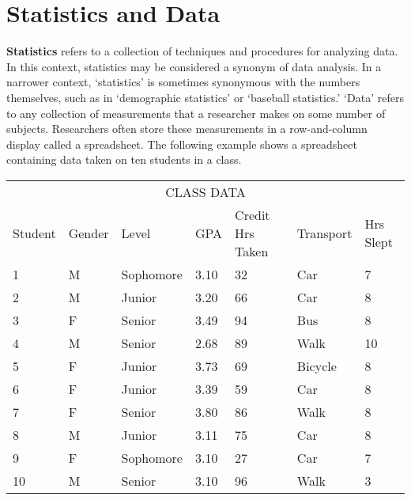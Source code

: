 \documentclass[11pt]{book}\usepackage[]{graphicx}\usepackage[]{color}
\begin{document}

\section{Statistics and Data}

\textbf{Statistics} refers to a collection of techniques and procedures for analyzing data.  In this context, statistics may be considered a synonym of data analysis.  In a narrower context, `statistics' is sometimes synonymous with the numbers themselves, such as in `demographic statistics' or `baseball statistics.'  `Data' refers to any collection of measurements that a researcher makes on some number of subjects.  Researchers often store these measurements in a row-and-column display called a spreadsheet.  The following example shows a spreadsheet containing data taken on ten students in a class.

  \begin{table}[htbp]
   \centering
  \begin{tabular}{@{} p{14mm} p{13mm} p{20mm} p{9mm} p{32mm} p{18mm} p{21mm} @{}} \hline %
   \multicolumn{7}{c}{CLASS DATA} \\
   Student & Gender & Level & GPA & Credit Hrs Taken & Transport & Hrs Slept \\ \hline
   1 & M & Sophomore & 3.10 & 32 & Car & 7 \\
   2 & M & Junior & 3.20 & 66 & Car & 8 \\
   3 & F & Senior & 3.49 & 94 & Bus & 8 \\
   4 & M & Senior & 2.68 & 89 & Walk & 10 \\
   5 & F & Junior & 3.73 & 69 & Bicycle & 8 \\
   6 & F & Junior & 3.39 & 59 & Car & 8 \\
   7 & F & Senior & 3.80 & 86 & Walk & 8 \\
   8 & M & Junior & 3.11 & 75 & Car & 8 \\
   9 & F & Sophomore & 3.10 & 27 & Car & 7 \\
   10 & M & Senior & 3.10 & 96 & Walk & 3 \\ \hline
   \end{tabular}
   \end{table}
\end{document}
